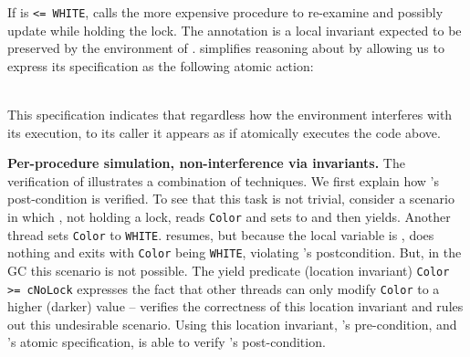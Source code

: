 If  is {\tt <= WHITE},  calls the more expensive procedure  to re-examine and possibly update  while holding the lock. 
The annotation   is a local invariant expected to be preserved by the environment of . 
\civl simplifies reasoning about  by allowing us to express its specification as the following atomic action:\\
\begin{footnotesize}
\begin{tt}
[if (Color <= WHITE)  Color := GRAY]
\end{tt}
\end{footnotesize}\\
This specification indicates that regardless how the environment interferes with its execution, to its caller it appears as if  atomically executes the code above. 

{\bf Per-procedure simulation, non-interference via invariants.}
The verification of  illustrates a combination of techniques. 
We first explain how 's post-condition is verified. 
To see that this task is not trivial, consider a scenario in which , not holding a lock, reads {\tt Color} and sets  to  and then yields. 
Another thread sets {\tt Color} to {\tt WHITE}. 
 resumes, but because the local variable  is , does nothing and exits with {\tt Color} being {\tt WHITE}, violating 's postcondition. 
But, in the GC this scenario is not possible. 
The yield predicate (location invariant) {\tt Color >= cNoLock} expresses the fact that other threads can only modify {\tt Color} to a higher (darker) value -- 
\civl verifies the correctness of this location invariant and rules out this undesirable scenario. 
Using this location invariant, 's pre-condition, and 's atomic specification, \civl is able to verify 's post-condition. 

